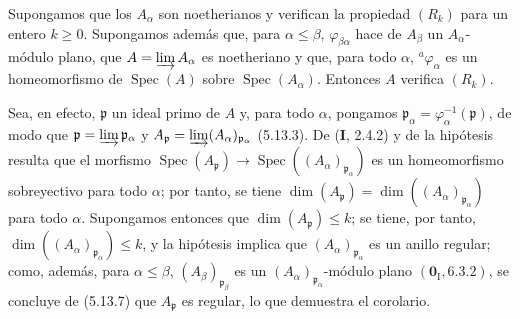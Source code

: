 \begin{corollary}[5.13.8]
\label{IV.2.s5.13.8-fr}
Supongamos que los $A_\alpha$ son noetherianos y verifican la propiedad
$(R_k)$ para un entero $k\geq0$. Supongamos además que, para
$\alpha\leq\beta$, $\varphi_{\beta\alpha}$ hace de $A_\beta$ un
$A_\alpha$-módulo plano, que $A=\varinjlim A_\alpha$ es noetheriano y que,
para todo $\alpha$, ${}^a\varphi_\alpha$ es un homeomorfismo de
$\operatorname{Spec}(A)$ sobre $\operatorname{Spec}(A_\alpha)$. Entonces $A$
verifica $(R_k)$.
\end{corollary}

Sea, en efecto, $\mathfrak p$ un ideal primo de $A$ y, para todo $\alpha$,
pongamos $\mathfrak p_\alpha=\varphi_\alpha^{-1}(\mathfrak p)$, de modo que
$\mathfrak p=\varinjlim\mathfrak p_\alpha$ y
$A_{\mathfrak p}=\varinjlim(A_\alpha)_{\mathfrak p_\alpha}$ (5.13.3). De
(\textbf I, 2.4.2) y de la hipótesis resulta que el morfismo
$\operatorname{Spec}(A_{\mathfrak p})
\longrightarrow\operatorname{Spec}((A_\alpha)_{\mathfrak p_\alpha})$
es un homeomorfismo sobreyectivo para todo $\alpha$; por tanto, se tiene
$\dim(A_{\mathfrak p})=\dim((A_\alpha)_{\mathfrak p_\alpha})$ para todo
$\alpha$. Supongamos entonces que $\dim(A_{\mathfrak p})\leq k$; se tiene,
por tanto, $\dim((A_\alpha)_{\mathfrak p_\alpha})\leq k$, y la hipótesis
implica que $(A_\alpha)_{\mathfrak p_\alpha}$ es un anillo regular; como,
además, para $\alpha\leq\beta$,
$(A_\beta)_{\mathfrak p_\beta}$ es un
$(A_\alpha)_{\mathfrak p_\alpha}$-módulo plano
$(\mathbf{0}_{\mathrm I}, 6.3.2)$, se concluye de (5.13.7) que
$A_{\mathfrak p}$ es regular, lo que demuestra el corolario.
